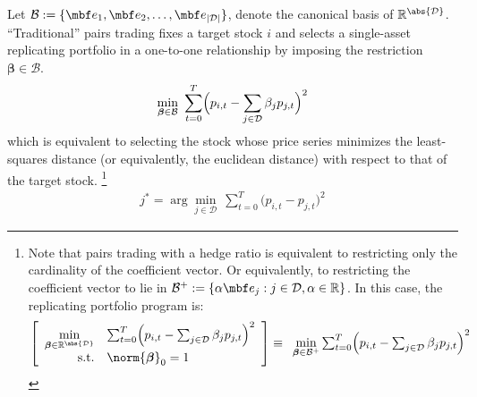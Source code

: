
Let $\mathcal B:=\{\mbf e_1,\mbf e_2,\dots,\mbf e_{|\mathcal D|}\}$, denote the canonical basis of $\mathbb R^{\abs{\mathcal D}}$. ``Traditional'' pairs trading fixes a target stock $i$ and selects a single-asset replicating portfolio in a one-to-one relationship by imposing the restriction $\boldsymbol \beta \in \mathcal B$.
\begin{align}\label{eq:choose_pair}
\min_{\boldsymbol \beta\in\mathcal B}{~
        \sum_{t=0}^{T}
        \Bigl(p_{i,t}-\sum_{j\in\mathcal D}\beta_j p_{j,t}\Bigr)^2
        }
\end{align} 
which is equivalent to selecting the stock whose price series minimizes the least-squares distance (or equivalently, the euclidean distance) with respect to that of the target stock. \footnote{
Note that pairs trading with a hedge ratio is equivalent to restricting only the cardinality of the coefficient vector. Or equivalently, to restricting the coefficient vector to lie in
$\mathcal B^+:=\{
\alpha \mbf e_j : j\in \mathcal D, \alpha\in\mathbb R
\}$. 
In this case, the replicating portfolio program is: 
$$
\left[
\begin{array}{rl}
\underset{\boldsymbol \beta\in\mathbb R^{\abs{\mathcal D}}}{\min}
& \sum_{t=0}^{T} \Bigl(p_{i,t}-\sum_{j\in\mathcal D}\beta_j p_{j,t}\Bigr)^2
\\
\mathrm{s.t.} & \norm{\boldsymbol{\beta}}_0 = 1
\end{array}
\right]
\equiv
\begin{array}{l}
\underset{\boldsymbol \beta\in\mathcal B^+}{\min}
        \sum_{t=0}^{T}
        \Bigl(p_{i,t}-\sum_{j\in\mathcal D}\beta_j p_{j,t}\Bigr)^2
\end{array}
$$
}
\begin{align}
j^*
= 
\arg \min_{j\in\mathcal D}{~
        \sum_{t=0}^{T}
        \bigl(p_{i,t}-p_{j,t}\bigr)^2
        } 
\end{align}

